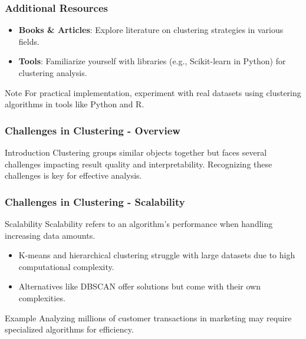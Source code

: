 \documentclass[aspectratio=169]{beamer}
\begin{document}
\begin{frame}[fragile]
    \frametitle{Additional Resources}
    \begin{itemize}
        \item \textbf{Books \& Articles}: Explore literature on clustering strategies in various fields.
        \item \textbf{Tools}: Familiarize yourself with libraries (e.g., Scikit-learn in Python) for clustering analysis.
    \end{itemize}
    \begin{block}{Note}
        For practical implementation, experiment with real datasets using clustering algorithms in tools like Python and R.
    \end{block}
\end{frame}

\begin{frame}[fragile]
    \frametitle{Challenges in Clustering - Overview}
    \begin{block}{Introduction}
        Clustering groups similar objects together but faces several challenges impacting result quality and interpretability. Recognizing these challenges is key for effective analysis.
    \end{block}
\end{frame}

\begin{frame}[fragile]
    \frametitle{Challenges in Clustering - Scalability}
    \begin{block}{Scalability}
        Scalability refers to an algorithm's performance when handling increasing data amounts.
    \end{block}
    \begin{itemize}
        \item K-means and hierarchical clustering struggle with large datasets due to high computational complexity.
        \item Alternatives like DBSCAN offer solutions but come with their own complexities.
    \end{itemize}
    \begin{exampleblock}{Example}
        Analyzing millions of customer transactions in marketing may require specialized algorithms for efficiency.
    \end{exampleblock}
\end{frame}
\end{document}
